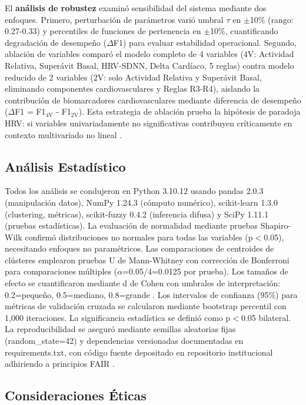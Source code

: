 El \textbf{análisis de robustez} examinó sensibilidad del sistema mediante dos enfoques. Primero, perturbación de parámetros varió umbral $\tau$ en $\pm$10\% (rango: 0.27-0.33) y percentiles de funciones de pertenencia en $\pm$10\%, cuantificando degradación de desempeño ($\Delta$F1) para evaluar estabilidad operacional. Segundo, ablación de variables comparó el modelo completo de 4 variables (4V: Actividad Relativa, Superávit Basal, HRV-SDNN, Delta Cardíaco, 5 reglas) contra modelo reducido de 2 variables (2V: solo Actividad Relativa y Superávit Basal, eliminando componentes cardiovasculares y Reglas R3-R4), aislando la contribución de biomarcadores cardiovasculares mediante diferencia de desempeño ($\Delta$F1 = F1$_{\text{4V}}$ - F1$_{\text{2V}}$). Esta estrategia de ablación prueba la hipótesis de paradoja HRV: si variables univariadamente no significativas contribuyen críticamente en contexto multivariado no lineal \cite{Godkin2025Context,Marino2024ARIC}.

\subsection{Análisis Estadístico}
\label{subsec:estadistica}

Todos los análisis se condujeron en Python 3.10.12 usando pandas 2.0.3 (manipulación datos), NumPy 1.24.3 (cómputo numérico), scikit-learn 1.3.0 (clustering, métricas), scikit-fuzzy 0.4.2 (inferencia difusa) y SciPy 1.11.1 (pruebas estadísticas). La evaluación de normalidad mediante pruebas Shapiro-Wilk \cite{Shapiro1965} confirmó distribuciones no normales para todas las variables (p$<$0.05), necesitando enfoques no paramétricos. Las comparaciones de centroides de clústeres emplearon pruebas U de Mann-Whitney \cite{Mann1947} con corrección de Bonferroni para comparaciones múltiples ($\alpha$=0.05/4=0.0125 por prueba). Los tamaños de efecto se cuantificaron mediante d de Cohen con umbrales de interpretación: 0.2=pequeño, 0.5=mediano, 0.8=grande \cite{Cohen1988}. Los intervalos de confianza (95\%) para métricas de validación cruzada se calcularon mediante bootstrap percentil con 1,000 iteraciones. La significancia estadística se definió como p$<$0.05 bilateral. La reproducibilidad se aseguró mediante semillas aleatorias fijas (random\_state=42) y dependencias versionadas documentadas en requirements.txt, con código fuente depositado en repositorio institucional adhiriendo a principios FAIR \cite{Wilkinson2016}.

\subsection{Consideraciones Éticas}
\label{subsec:etica}

